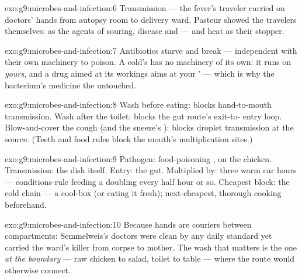 \begin{solution}{exo:g9:microbes-and-infection:6}
Transmission --- the fever's traveler carried on doctors'
hands from autopsy room to delivery ward. Pasteur showed
the travelers themselves:  as the agents of
souring, disease and  --- and heat as their
stopper.
\end{solution}

\begin{solution}{exo:g9:microbes-and-infection:7}
Antibiotics starve and break  --- independent
 with their own machinery to poison. A cold's 
has no machinery of its own: it runs on \emph{yours}, and
a drug aimed at its workings aims at your ' ---
which is why the bacterium's medicine  the 
untouched.
\end{solution}

\begin{solution}{exo:g9:microbes-and-infection:8}
Wash before eating: blocks hand-to-mouth transmission.
Wash after the toilet: blocks the gut route's exit-to-
entry loop. Blow-and-cover the cough (and the sneeze's
): blocks droplet transmission at the source. (Teeth
and food rules block the mouth's multiplication sites.)
\end{solution}

\begin{solution}{exo:g9:microbes-and-infection:9}
Pathogen: food-poisoning , on the chicken.
Transmission: the dish itself. Entry: the gut. Multiplied
by: three warm car hours --- conditions-rule feeding a
doubling every half hour or so. Cheapest block: the cold
chain --- a cool-box (or eating it fresh); next-cheapest,
thorough cooking beforehand.
\end{solution}

\begin{solution}{exo:g9:microbes-and-infection:10}
Because hands are couriers between compartments:
Semmelweis's doctors were clean by any daily standard yet
carried the ward's killer from corpse to mother. The wash
that matters is the one \emph{at the boundary} --- raw
chicken to salad, toilet to table --- where the route
would otherwise connect.
\end{solution}

